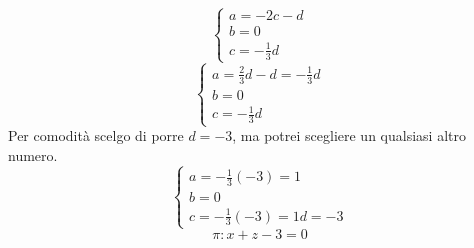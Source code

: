 \documentclass{article}     %
\begin{document}
                \[\left\{\begin{array}{l}
                    a=-2c-d\\
                    b=0\\
                    c=-\frac{1}{3}d
                \end{array} \right.\]
                \[\left\{\begin{array}{l}
                    a=\frac{2}{3}d-d=-\frac{1}{3}d\\
                    b=0\\
                    c=-\frac{1}{3}d
                \end{array} \right.\]
                Per comodità scelgo di porre $d=-3$, ma potrei scegliere un qualsiasi altro numero.
                \[\left\{\begin{array}{l}
                    a=-\frac{1}{3}(-3)=1\\
                    b=0\\
                    c=-\frac{1}{3}(-3)=1
                    d=-3
                \end{array} \right.\]
                \[\pi:x+z-3=0\]
\end{document}
